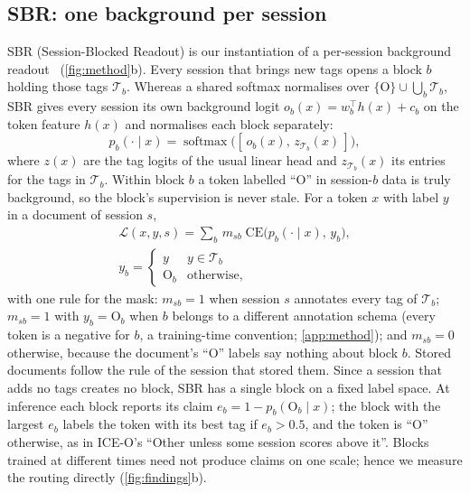 \documentclass[10pt,twocolumn,letterpaper]{article}
\begin{document}
\subsection{SBR: one background per session}
\label{sec:sbr}
SBR (Session-Blocked Readout) is our instantiation of a per-session background readout~\citep{liu2023ice,kim2022more} (\cref{fig:method}b). Every session that brings new tags opens a block $b$ holding those tags $\mathcal{T}_b$. Whereas a shared softmax normalises over $\{\mathrm{O}\}\cup\bigcup_b\mathcal{T}_b$, SBR gives every session its own background logit $o_b(x)=w_b^{\top}h(x)+c_b$ on the token feature $h(x)$ and normalises each block separately:
\begin{equation}
p_b(\cdot\mid x)=\operatorname{softmax}\big([\,o_b(x),\,z_{\mathcal{T}_b}(x)\,]\big),
\label{eq:block}
\end{equation}
where $z(x)$ are the tag logits of the usual linear head and $z_{\mathcal{T}_b}(x)$ its entries for the tags in $\mathcal{T}_b$. Within block $b$ a token labelled ``O'' in session-$b$ data is truly background, so the block's supervision is never stale. For a token $x$ with label $y$ in a document of session $s$,
\begin{equation}
\begin{gathered}
\mathcal{L}(x,y,s)=\sum_{b}\,m_{sb}\;\mathrm{CE}\big(p_b(\cdot\mid x),\,y_b\big),\\
y_b=\begin{cases} y & y\in\mathcal{T}_b\\ \mathrm{O}_b & \text{otherwise,}\end{cases}
\end{gathered}
\label{eq:sbr}
\end{equation}
with one rule for the mask: $m_{sb}{=}1$ when session $s$ annotates every tag of $\mathcal{T}_b$; $m_{sb}{=}1$ with $y_b{=}\mathrm{O}_b$ when $b$ belongs to a different annotation schema (every token is a negative for $b$, a training-time convention; \cref{app:method}); and $m_{sb}{=}0$ otherwise, because the document's ``O'' labels say nothing about block $b$. Stored documents follow the rule of the session that stored them. Since a session that adds no tags creates no block, SBR has a single block on a fixed label space. At inference each block reports its claim $e_b=1-p_b(\mathrm{O}_b\mid x)$; the block with the largest $e_b$ labels the token with its best tag if $e_b>0.5$, and the token is ``O'' otherwise, as in ICE-O's ``Other unless some session scores above it''. Blocks trained at different times need not produce claims on one scale; hence we measure the routing directly (\cref{fig:findings}b).
\end{document}
